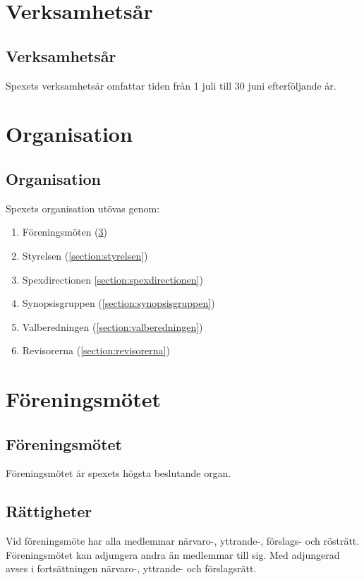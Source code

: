 \documentclass[a4paper]{article}
\begin{document}
\section{Verksamhetsår}
\subsection{Verksamhetsår}
Spexets verksamhetsår omfattar tiden från 1 juli till 30 juni efterföljande år.

\section{Organisation}
\subsection{Organisation}
Spexets organisation utövas genom:

\begin{enumerate}
  \item Föreningsmöten (\ref{section:föreningsmötet})
  \item Styrelsen (\ref{section:styrelsen})
  \item Spexdirectionen \ref{section:spexdirectionen})
  \item Synopsisgruppen (\ref{section:synopsisgruppen})
  \item Valberedningen (\ref{section:valberedningen})
  \item Revisorerna (\ref{section:revisorerna})
\end{enumerate}

\section{Föreningsmötet}
\label{section:föreningsmötet}

\subsection{Föreningsmötet}
Föreningsmötet är spexets högsta beslutande organ.

\subsection{Rättigheter}
Vid föreningsmöte har alla medlemmar närvaro-, yttrande-, förslags- och rösträtt. Föreningsmötet kan adjungera andra än medlemmar till sig. Med adjungerad avses i fortsättningen närvaro-, yttrande- och förslagsrätt.
\end{document}
